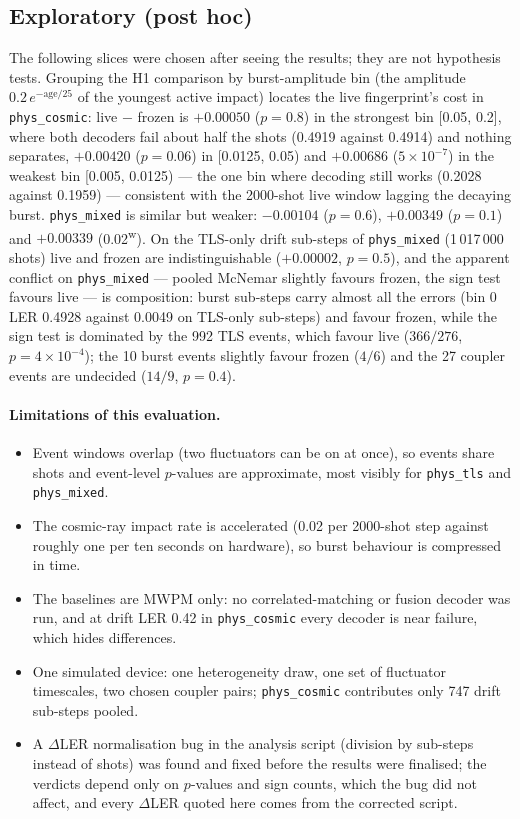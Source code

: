 \documentclass[11pt,a4paper]{article}
\newcommand{\reg}[1]{\texttt{#1}}
\newcommand{\E}[2]{${#1}{\times}10^{-#2}$}  %
\newcommand{\Eb}[2]{{#1}{\times}10^{-#2}}   %
\newcommand{\weak}{\textsuperscript{w}}     %
\begin{document}
\subsection{Exploratory (post hoc)}\label{sec:phys-explor}
The following slices were chosen after seeing the results; they are not hypothesis tests. Grouping the H1
comparison by burst-amplitude bin (the amplitude $0.2\,e^{-\mathrm{age}/25}$ of the youngest active impact)
locates the live fingerprint's cost in \reg{phys\_cosmic}: live $-$ frozen is $+0.00050$
($p=0.8$) in the strongest bin [0.05, 0.2], where both decoders fail about half the shots (0.4919 against
0.4914) and nothing separates, $+0.00420$ ($p=0.06$) in [0.0125, 0.05) and $+0.00686$ (\E{5}{7})
in the weakest bin [0.005, 0.0125) --- the one bin where decoding still works (0.2028 against 0.1959) ---
consistent with the 2000-shot live window lagging the decaying burst. \reg{phys\_mixed} is similar
but weaker: $-0.00104$ ($p=0.6$), $+0.00349$ ($p=0.1$) and $+0.00339$
(0.02\weak). On the TLS-only drift sub-steps of \reg{phys\_mixed} (1\,017\,000 shots) live and frozen are
indistinguishable ($+0.00002$, $p=0.5$), and the apparent conflict on \reg{phys\_mixed} --- pooled McNemar
slightly favours frozen, the sign test favours live --- is composition: burst sub-steps carry almost all
the errors (bin 0 LER 0.4928 against 0.0049 on TLS-only sub-steps) and favour frozen, while the sign test
is dominated by the 992 TLS events, which
favour live ($366/276$, $p=\Eb{4}{4}$); the 10 burst events slightly favour frozen ($4/6$) and the 27
coupler events are undecided ($14/9$, $p=0.4$).

\paragraph{Limitations of this evaluation.}
\begin{itemize}
  \item Event windows overlap (two fluctuators can be on at once), so events share shots and event-level
        $p$-values are approximate, most visibly for \reg{phys\_tls} and \reg{phys\_mixed}.
  \item The cosmic-ray impact rate is accelerated (0.02 per 2000-shot step against roughly one per ten
        seconds on hardware), so burst behaviour is compressed in time.
  \item The baselines are MWPM only: no correlated-matching or fusion decoder was run, and at drift LER
        0.42 in \reg{phys\_cosmic} every decoder is near failure, which hides differences.
  \item One simulated device: one heterogeneity draw, one set of fluctuator timescales, two chosen coupler
        pairs; \reg{phys\_cosmic} contributes only 747 drift sub-steps pooled.
  \item A $\Delta$LER normalisation bug in the analysis script (division by sub-steps instead of shots) was
        found and fixed before the results were finalised; the verdicts depend only on $p$-values and sign
        counts, which the bug did not affect, and every $\Delta$LER quoted here comes from the corrected
        script.
\end{itemize}
\end{document}

